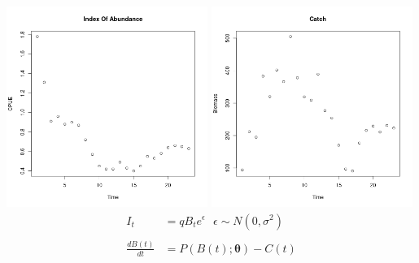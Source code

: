 \documentclass[ xcolor = pdftex, dvipsnames, table ]{beamer}
\begin{document}
%
\begin{frame}{}
\includegraphics[width=0.49\textwidth]{../plots/hakeIndex.png}
\includegraphics[width=0.49\textwidth]{../plots/hakeCatch.png}
\begin{align*}
I_t &= q B_t e^\epsilon ~~~ \epsilon\sim N(0, \sigma^2) \\
~\\
\frac{dB(t)}{dt} &= P(B(t);\bm{\theta}) - C(t)
\end{align*}
\end{frame}
\end{document}
